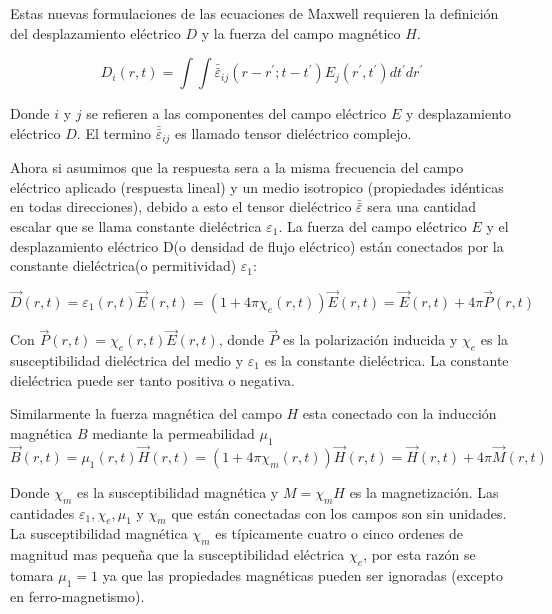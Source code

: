 \documentclass[a4paper,openright,12pt]{book}
\begin{document}
Estas nuevas formulaciones de las ecuaciones de Maxwell requieren la definición del desplazamiento eléctrico $D$ y la fuerza del campo magnético $H$.


\begin{equation}\label{desplazamientoelectrico1}
D_{i}(r,t)=\int\int \bar{\bar{\varepsilon}}_{ij}(r-r^{'};t-t^{'})E_{j}(r^{'},t^{'})dt^{'}dr^{'}
\end{equation}

Donde $i$ y $j$ se refieren a las componentes del campo eléctrico $E$ y desplazamiento eléctrico $D$. El termino $\bar{\bar{\varepsilon}}_{ij}$ es llamado tensor dieléctrico complejo.

Ahora si asumimos que la respuesta sera a la misma frecuencia del campo eléctrico aplicado (respuesta lineal) y un medio isotropico (propiedades idénticas en todas direcciones), debido a esto el tensor dieléctrico $\bar{\bar{\varepsilon}}$ sera una cantidad escalar que se llama constante dieléctrica $\varepsilon_{1}$. La fuerza del campo eléctrico $E$ y el desplazamiento eléctrico D(o densidad de flujo eléctrico) están conectados por la constante dieléctrica(o permitividad) $\varepsilon_{1}$:

\begin{equation}\label{1.5}
\vec{D}(r,t)=\varepsilon_{1}(r,t)\vec{E}(r,t)=(1+4\pi\chi_{e}(r,t))\vec{E}(r,t)=\vec{E}(r,t)+4\pi \vec{P}(r,t)
\end{equation}

Con $\vec{P}(r,t)=\chi_{e}(r,t)\vec{E}(r,t)$, donde $\vec{P}$ es la polarización inducida y $\chi_{e}$ es la susceptibilidad dieléctrica del medio y $\varepsilon_{1}$ es la constante dieléctrica. La constante dieléctrica puede ser tanto positiva o negativa.

Similarmente la fuerza magnética del campo $H$ esta conectado con la inducción magnética $B$
mediante la permeabilidad $\mu_{1}$
\begin{equation}\label{1.6}
\vec{B}(r,t)=\mu_{1}(r,t)\vec{H}(r,t)=(1+4\pi \chi_{m}(r,t))\vec{H}(r,t)=\vec{H}(r,t)+4\pi \vec{M}(r,t)
\end{equation}

Donde $\chi_{m}$ es la susceptibilidad magnética y $M=\chi_{m} H$ es la magnetización. Las cantidades $\varepsilon_{1},\chi_{e},\mu_{1}$ y $\chi_{m}$ que están conectadas con los campos son sin unidades. La susceptibilidad magnética $\chi_{m}$ es típicamente cuatro o cinco ordenes de magnitud mas pequeña que la susceptibilidad eléctrica $\chi_{e}$, por esta razón se tomara $\mu_{1}=1$ ya que las propiedades magnéticas pueden ser ignoradas (excepto en ferro-magnetismo).
\end{document}
